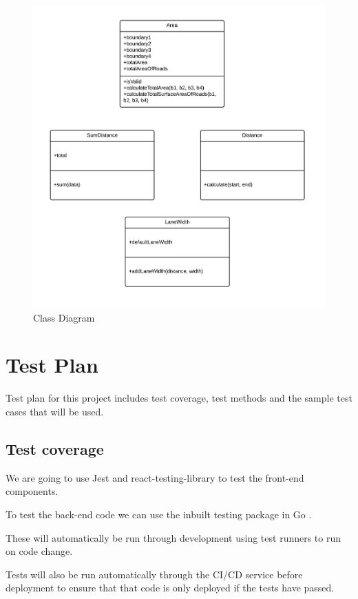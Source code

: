 \documentclass[a4paper,11pt]{article}
\begin{document}
\begin{figure}[H]
  \includegraphics[width=\textwidth]{class-diagram}
  \caption{Class Diagram}\label{fig:class-diagram}
\end{figure}

\section{Test Plan}

Test plan for this project includes test coverage, test methods and the sample
test cases that will be used.

\subsection{Test coverage}

We are going to use Jest \autocite{jest:11} and react-testing-library
\autocite{rtl:12} to test the front-end components.

To test the back-end code we can use the inbuilt testing package in Go
\autocite{go:13}.

These will automatically be run through development using test runners to run on
code change.

Tests will also be run automatically through the CI/CD service before deployment
to ensure that that code is only deployed if the tests have passed.
\end{document}
